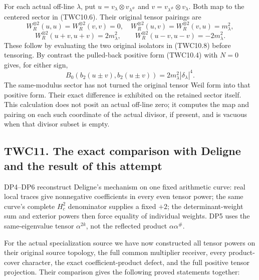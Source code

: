 For each actual off-line \(\lambda\), put
\(u=v_\lambda\otimes v_{\lambda^\#}\) and
\(v=v_{\lambda^\#}\otimes v_\lambda\). Both map to the centered sector
in (TWC10.6). Their original tensor pairings are \[
W_R^{\otimes2}(u,u)=W_R^{\otimes2}(v,v)=0,
\quad W_R^{\otimes2}(u,v)=W_R^{\otimes2}(v,u)=m_\lambda^2,
\] \[
\boxed{\quad W_R^{\otimes2}(u+v,u+v)=2m_\lambda^2,
\qquad W_R^{\otimes2}(u-v,u-v)=-2m_\lambda^2.\quad}
\tag{TWC10.11}
\] These follow by evaluating the two original isolators in (TWC10.8)
before tensoring. By contrast the pulled-back positive form (TWC10.4)
with \(N=0\) gives, for either sign, \[
B_0(b_2(u\pm v),b_2(u\pm v))=2m_\lambda^2|\delta_\lambda|^4.
\tag{TWC10.12}
\] The same-modulus sector has not turned the original tensor Weil form
into that positive form. Their exact difference is exhibited on the
retained sector itself. This calculation does not posit an actual
off-line zero; it computes the map and pairing on each such coordinate
of the actual divisor, if present, and is vacuous when that divisor
subset is empty.

\subsection{TWC11. The exact comparison with Deligne and the result of
this
attempt}\label{twc11.-the-exact-comparison-with-deligne-and-the-result-of-this-attempt}

DP4--DP6 reconstruct Deligne's mechanism on one fixed arithmetic curve:
real local traces give nonnegative coefficients in every even tensor
power; the same curve's complete \(H_c^2\) denominator supplies a fixed
\(+2\); the determinant-weight sum and exterior powers then force
equality of individual weights. DP5 uses the same-eigenvalue tensor
\(\alpha^{2k}\), not the reflected product \(\alpha\alpha^\#\).

For the actual specialization source we have now constructed all tensor
powers on their original source topology, the full common multiplier
receiver, every product-cover character, the exact coefficient-product
defect, and the full positive tensor projection. Their comparison gives
the following proved statements together:

